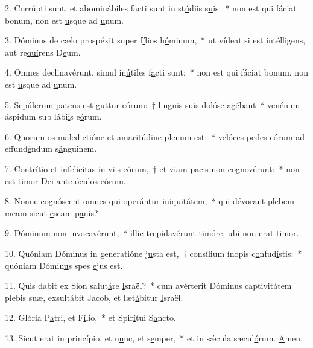 2. Corrúpti sunt, et abominábiles facti sunt in st\uline{ú}diis s\uline{u}is:~* non est qui fáciat bonum, non est \uline{u}sque ad \uline{u}num.\par 
3. Dóminus de cælo prospéxit super f\uline{í}lios h\uline{ó}minum,~* ut vídeat si est intélligens, aut re\uline{quí}rens D\uline{e}um.\par 
4. Omnes declinavérunt, simul in\uline{ú}tiles f\uline{a}cti sunt:~* non est qui fáciat bonum, non est \uline{u}sque ad \uline{u}num.\par 
5. Sepúlcrum patens est guttur e\uline{ó}rum:~† linguis suis dol\uline{ó}se ag\uline{é}bant~* venénum áspidum sub lábi\uline{i}s e\uline{ó}rum.\par 
6. Quorum os maledictióne et amarit\uline{ú}dine pl\uline{e}num est:~* velóces pedes eórum ad effund\uline{é}ndum s\uline{á}nguinem.\par 
7. Contrítio et infelícitas in viis e\uline{ó}rum,~† et viam pacis non c\uline{o}gnov\uline{é}runt:~* non est timor Dei ante ócul\uline{o}s e\uline{ó}rum.\par 
8. Nonne cognóscent omnes qui operántur in\uline{i}quit\uline{á}tem,~* qui dévorant plebem meam sicut \uline{e}scam p\uline{a}nis?\par 
9. Dóminum non inv\uline{o}cav\uline{é}runt,~* illic trepidavérunt timóre, ubi non \uline{e}rat t\uline{i}mor.\par 
10. Quóniam Dóminus in generatióne \uline{ju}sta est,~† consílium ínopis c\uline{o}nfud\uline{í}stis:~* quóniam Dómin\uline{u}s spes \uline{e}jus est.\par 
11. Quis dabit ex Sion salut\uline{á}re \uline{I}sraël?~* cum avérterit Dóminus captivitátem plebis suæ, exsultábit Jacob, et læt\uline{á}bitur \uline{I}sraël.\par 
12. Glória P\uline{a}tri, et F\uline{í}lio,~* et Spir\uline{í}tui S\uline{a}ncto.\par 
13. Sicut erat in princípio, et n\uline{u}nc, et s\uline{e}mper,~* et in sǽcula sæcul\uline{ó}rum. \uline{A}men.\par 
